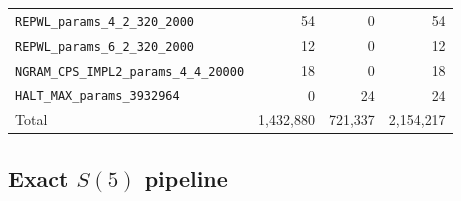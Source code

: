 \documentclass[a4paper,british]{article}
\theoremstyle{definition} %
\numberwithin{equation}{section}
\theoremstyle{definition} %
\begin{document}
\begin{table}[h!]
\begin{tabular}{|lrrr|}
        \texttt{REPWL\_params\_4\_2\_320\_2000}           & 54            & 0         & 54            \\
        \texttt{REPWL\_params\_6\_2\_320\_2000}           & 12            & 0         & 12            \\
        \texttt{NGRAM\_CPS\_IMPL2\_params\_4\_4\_20000}   & 18            & 0         & 18            \\
        \texttt{HALT\_MAX\_params\_3932964}               & 0             & 24        & 24            \\
        \hline
        Total                                             & 1{,}432{,}880 & 721{,}337 & 2{,}154{,}217 \\
        \hline
    \end{tabular}
\end{table}

\subsection{Exact $S(5)$ pipeline}
\end{document}
